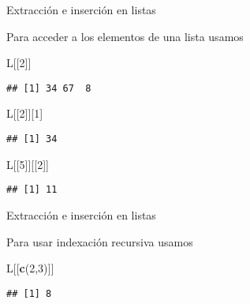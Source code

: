 \documentclass[ignorenonframetext,]{beamer}
\newenvironment{Shaded}{\begin{snugshade}}{\end{snugshade}}
\newcommand{\KeywordTok}[1]{\textcolor[rgb]{0.13,0.29,0.53}{\textbf{#1}}}
\newcommand{\DecValTok}[1]{\textcolor[rgb]{0.00,0.00,0.81}{#1}}
\newcommand{\NormalTok}[1]{#1}
\begin{document}
\begin{frame}[fragile]{Extracción e inserción en listas}

Para acceder a los elementos de una lista usamos

\begin{Shaded}
\begin{Highlighting}[]
\NormalTok{L[[}\DecValTok{2}\NormalTok{]]}
\end{Highlighting}
\end{Shaded}
\pause
\begin{verbatim}
## [1] 34 67  8
\end{verbatim}

\begin{Shaded}
\begin{Highlighting}[]
\NormalTok{L[[}\DecValTok{2}\NormalTok{]][}\DecValTok{1}\NormalTok{]}
\end{Highlighting}
\end{Shaded}
\pause
\begin{verbatim}
## [1] 34
\end{verbatim}

\begin{Shaded}
\begin{Highlighting}[]
\NormalTok{L[[}\DecValTok{5}\NormalTok{]][[}\DecValTok{2}\NormalTok{]]}
\end{Highlighting}
\end{Shaded}
\pause
\begin{verbatim}
## [1] 11
\end{verbatim}

\end{frame}

\begin{frame}[fragile]{Extracción e inserción en listas}

Para usar indexación recursiva usamos

\begin{Shaded}
\begin{Highlighting}[]
\NormalTok{L[[}\KeywordTok{c}\NormalTok{(}\DecValTok{2}\NormalTok{,}\DecValTok{3}\NormalTok{)]]}
\end{Highlighting}
\end{Shaded}
\pause
\begin{verbatim}
## [1] 8
\end{verbatim}

\end{frame}
\end{document}
